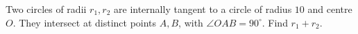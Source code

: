Two circles of radii $r_1,r_2$ are internally tangent to a circle of radius $10$ and centre $O$. They intersect at distinct points $A,B$, with $\angle OAB=90^\circ$. Find $r_1+r_2$.
